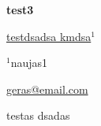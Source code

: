 \documentclass[12pt, twoside, a4paper, hidelinks]{article}
\begin{document}
\begin{center} \fontsize{14}{15}\selectfont \textbf{ test3 } \end{center}
\vspace{-0.8cm}

\begin{center} \fontsize{12}{13}\selectfont \underline{testdsadsa kmdsa}$^{1}$ \end{center}
\vspace{-.5cm}

\begin{center} \fontsize{10}{11}\selectfont $^{1}$naujas1
    
    \underline{geras@email.com} \end{center}

\fontsize{10}{11}\selectfont
testas dsadas
\end{document}
